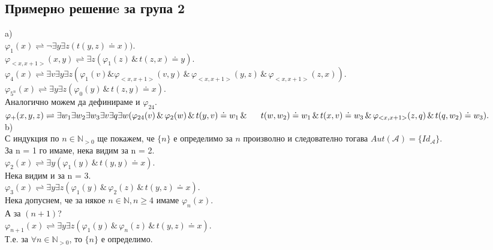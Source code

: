 \documentclass{article}
\begin{document}
\subsection{Примернo решениe за група 2}
\begin{addmargin}[1em]{2em}
a) \\
$ \varphi_{1}(x) \rightleftharpoons \neg \exists y \exists z (t(y, z) \doteq x)). $\\
$ \varphi_{<x,x+1>}(x, y) \rightleftharpoons \exists z (\varphi_{1}(z) \, \& \,  t(z, x) \doteq y). $\\
$ \varphi_{4}(x) \rightleftharpoons \exists v \exists y \exists z (\varphi_{1}(v) \& \varphi_{<x,x+1>}(v, y) \, \& \, \varphi_{<x,x+1>}(y, z) \,  \& \, \varphi_{<x,x+1>}(z, x)). $\\
$ \varphi_{5^n}(x) \rightleftharpoons \exists y \exists z (\varphi_{0}(y) \, \& \, t(z, y) \doteq x). $\\
Аналогично можем да дефинираме и $ \varphi_{24}$. \\
$ \varphi_{+}(x, y, z) \rightleftharpoons \exists w_1 \exists w_2 \exists w_3 \exists v \exists q \exists w (\varphi_{24}(v) \,  \& \, \varphi_{2}(w) \,  \&  \,  t(y, v) \doteq w_1 \, \& \\ \indent \,  t(w, w_2) \doteq w_1  \, \& \, t(x, v) \doteq w_3 \, \& \, \varphi_{<x,x+1>}(z, q)\,  \& \, t(q, w_2) \doteq w_3).$ \\
b) \\
С индукция по $n \in \mathbb N_{> 0}$ ще покажем, че $\{n\}$ е определимо за $n$ произволно и следователно тогава $Aut(\mathcal{A})= \{Id_{\mathcal{A}}\}$.\\
За n = 1 го имаме, нека видим за n = 2.\\
$ \varphi_{2}(x) \rightleftharpoons \exists y (\varphi_{1}(y) \, \& \, t(y, y) \doteq x). $\\
Нека видим и за n = 3.\\
$ \varphi_{3}(x) \rightleftharpoons \exists y \exists z (\varphi_{1}(y) \, \& \,  \varphi_{2}(z) \, \& \,t(y, z) \doteq x). $\\
Нека допуснем, че за някое $n \in \mathbb{N}, n \geq 4$ имаме $\varphi_{n}(x)$.\\
А за $(n+1)$?\\
$ \varphi_{n+1}(x) \rightleftharpoons \exists y \exists z (\varphi_{1}(y) \, \& \, \varphi_{n}(z) \, \& \, t(y, z) \doteq x). $\\
Т.е. за $\forall n \in \mathbb N_{> 0}$, то $\{n\}$ е определимо.
\end{addmargin}
\end{document}

